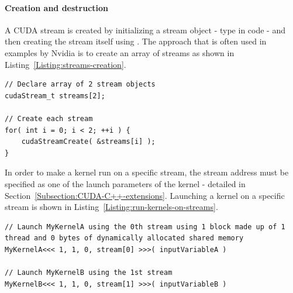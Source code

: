 \paragraph{Creation and destruction}
A CUDA stream is created by initializing a stream object - type  in code - and then creating the stream itself using . The approach that is often used in examples by Nvidia is to create an array of streams as shown in Listing~\ref{Listing:streams-creation}.

\begin{lstlisting}[caption={Creation of streams. Taken from Nvidia's \emph{CUDA C++ Programming Guide} \cite{NVIDIAMay2022}.},label={Listing:streams-creation}]
// Declare array of 2 stream objects
cudaStream_t streams[2];

// Create each stream
for( int i = 0; i < 2; ++i ) {
	cudaStreamCreate( &streams[i] );
}
\end{lstlisting}

In order to make a kernel run on a specific stream, the stream address must be specified as one of the launch parameters of the kernel - detailed in Section~\ref{Subsection:CUDA-C++-extensions}. Launching a kernel on a specific stream is shown in Listing~\ref{Listing:run-kernels-on-streams}.

\begin{lstlisting}[caption={Pseudo-code for launching two different kernels using two different streams. The instructions in this example would be executed from the host. Since each kernel is essentially an open door to the device for instructions, then, once \code{MyKernelA} is launched on \code{stream[0]}, the control is returned to the host without waiting for \code{MyKernelA} to finish. Subsequently, the host will immediately launch \code{MyKernelB} using \code{stream[1]}. In this example, each kernel is launched on a grid made up of one single-thread block with 0 bytes of dynamic shared memory allocated, thus, the devic resources will not be exhausted and both kernels will run concurrently. Taken from Nvidia's \emph{CUDA C++ Programming Guide} \cite{NVIDIAMay2022}.},label={Listing:run-kernels-on-streams}]
// Launch MyKernelA using the 0th stream using 1 block made up of 1 thread and 0 bytes of dynamically allocated shared memory
MyKernelA<<< 1, 1, 0, stream[0] >>>( inputVariableA )

// Launch MyKernelB using the 1st stream
MyKernelB<<< 1, 1, 0, stream[1] >>>( inputVariableB )
\end{lstlisting}

